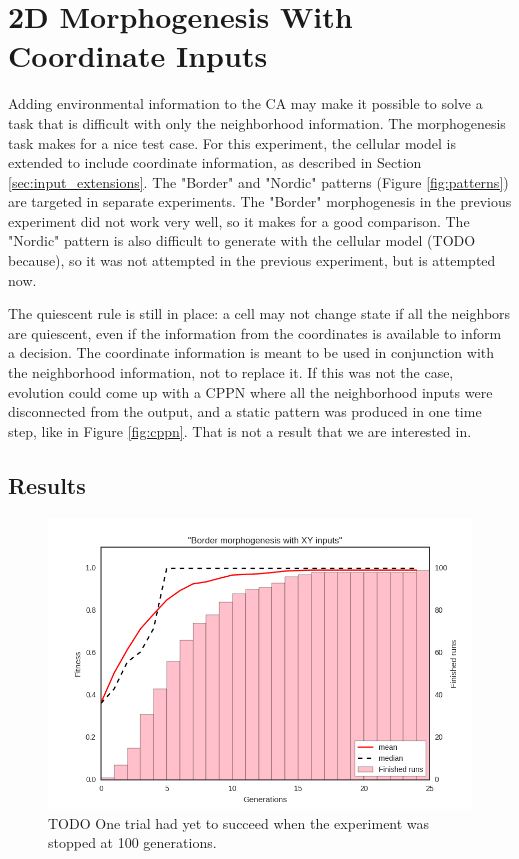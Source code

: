\section{2D Morphogenesis With Coordinate Inputs}
\label{sec:morphXY}
Adding environmental information to the CA may make it possible to solve a task that is difficult with only the neighborhood information.
The morphogenesis task makes for a nice test case.
For this experiment, the cellular model is extended to include coordinate information, as described in Section \ref{sec:input_extensions}.
The "Border" and "Nordic" patterns (Figure \ref{fig:patterns}) are targeted in separate experiments.
The "Border" morphogenesis in the previous experiment did not work very well, so it makes for a good comparison.
The "Nordic" pattern is also difficult to generate with the cellular model (TODO because), so it was not attempted in the previous experiment,
but is attempted now.

The quiescent rule is still in place: a cell may not change state if all the neighbors are quiescent, even if the information from the coordinates is available to inform a decision.
The coordinate information is meant to be used in conjunction with the neighborhood information, not to replace it.
If this was not the case, evolution could come up with a CPPN where all the neighborhood inputs were disconnected from the output,
and a static pattern was produced in one time step, like in Figure \ref{fig:cppn}.
That is not a result that we are interested in.

\subsection{Results}

\begin{figure}
\centering
\includegraphics[width=\textwidth, keepaspectratio]{fig/generate_border_extended_results}
\caption{
    TODO
    One trial had yet to succeed when the experiment was stopped at 100 generations.
}
\label{fig:generate_border_extended_result}
\end{figure}


